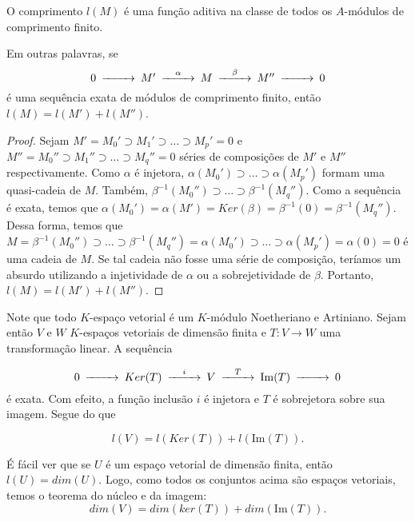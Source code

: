 \begin{theorem}
	\label{loc:6.9_:_o_comprimento_é_uma_função_aditiva}
	O comprimento $l(M)$ é uma função aditiva na classe de todos os $A$-módulos de comprimento finito.

	Em outras palavras, se
	\begin{equation*}
		\begin{CD}
			0@>{}>>M'@>{\alpha}>>M@>{\beta}>>M''@>{}>>0
		\end{CD}
	\end{equation*}
	é uma sequência exata de módulos de comprimento finito, então $l(M)=l(M')+l(M'')$.
	\begin{proof}

		Sejam $M' = M_{0}'\supset M_{1}'\supset\dots \supset M_{p}' = 0$ e $M'' = M_{0}''\supset M_{1}''\supset\dots \supset M_{q}'' = 0$ séries de composições de $M'$ e $M''$ respectivamente.
		Como $\alpha$ é injetora, $\alpha(M_{0}')\supset\dots \supset\alpha(M_{p}')$ formam uma quasi-cadeia de $M$.
		Também, $\beta ^{-1}(M_{0}'') \supset \dots \supset \beta ^{-1}(M_{q}'')$.
		Como a sequência é exata, temos que $\alpha(M_{0}')=\alpha(M')=Ker(\beta)=\beta ^{-1}(0)=\beta ^{-1}(M_{q}'')$.
		Dessa forma, temos que $M=\beta ^{-1}(M_{0}'')\supset\dots \supset \beta ^{-1}(M_{q}'') = \alpha(M_{0}')\supset\dots \supset \alpha(M_{p}')=\alpha(0)=0$ é uma cadeia de $M$.
		Se tal cadeia não fosse uma série de composição, teríamos um absurdo utilizando a injetividade de $\alpha$ ou a sobrejetividade de $\beta$. Portanto, $l(M)=l(M')+l(M'')$.
	\end{proof}
\end{theorem}
Note que todo $K$-espaço vetorial é um $K$-módulo Noetheriano e Artiniano. Sejam então $V$ e $W$ $K$-espaços vetoriais de dimensão finita e $T:V\to W$ uma transformação linear.
A sequência

\begin{equation*}
	\begin{CD}
		0@>{}>>Ker(T)@>{i}>>V@>{T}>>\mathrm{Im}(T)@>{}>>0
	\end{CD}
\end{equation*}
é exata. Com efeito, a função inclusão $i$ é injetora e $T$ é sobrejetora sobre sua imagem. Segue do  que

\begin{equation*}
	l(V)=l(Ker(T))+l(\mathrm{Im}(T)).
\end{equation*}

É fácil ver que se $U$ é um espaço vetorial de dimensão finita, então $l(U)=dim(U)$. Logo, como todos os conjuntos acima são espaços vetoriais, temos o teorema do núcleo e da imagem:
\begin{equation*}
	dim(V)=dim(ker(T))+dim(\mathrm{Im}(T)).
\end{equation*}


